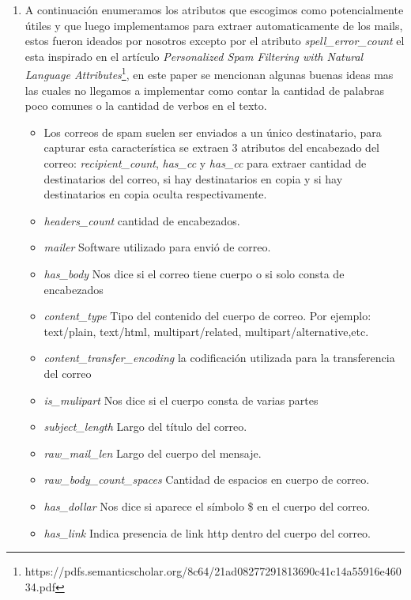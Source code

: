 
\begin{enumerate}

\item A continuación enumeramos los atributos que escogimos como potencialmente útiles y que luego implementamos para extraer automaticamente de los mails, estos fueron ideados por nosotros excepto por el atributo \textit{spell\_error\_count} el esta inspirado en el artículo \textit{Personalized Spam Filtering with
Natural Language Attributes}\footnote{https://pdfs.semanticscholar.org/8c64/21ad08277291813690c41c14a55916e46034.pdf}, en este paper se mencionan algunas buenas ideas mas las cuales no llegamos a implementar como contar la cantidad de palabras poco comunes o la cantidad de verbos en el texto.

\begin{itemize}
\item Los correos de spam suelen ser enviados a un único destinatario, para capturar esta característica se extraen 3 atributos del encabezado del correo: \textit{recipient\_count}, \textit{has\_cc} y \textit{has\_cc} para extraer cantidad de destinatarios del correo, si hay destinatarios en copia y si hay destinatarios en copia oculta respectivamente.
\item \textit{headers\_count} cantidad de encabezados.
\item \textit{mailer} Software utilizado para envió de correo. 
\item \textit{has\_body} Nos dice si el correo tiene cuerpo o si solo consta de encabezados
\item \textit{content\_type} Tipo del contenido del cuerpo de correo. Por ejemplo: text/plain, text/html, multipart/related, multipart/alternative,etc. 
\item \textit{content\_transfer\_encoding} la codificación utilizada para la transferencia del correo
\item \textit{is\_mulipart} Nos dice si el cuerpo consta de varias partes
\item \textit{subject\_length} Largo del título  del correo.
\item \textit{raw\_mail\_len} Largo del cuerpo del mensaje. 
\item \textit{raw\_body\_count\_spaces} Cantidad de espacios en cuerpo de correo.
\item \textit{has\_dollar} Nos dice si aparece el símbolo \$ en el cuerpo del correo. 
\item \textit{has\_link} Indica presencia de link http dentro del cuerpo del correo. 

\end{itemize}
\end{enumerate}
